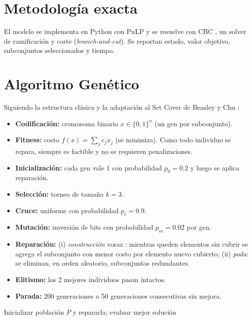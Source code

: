 \documentclass[11pt,a4paper]{article}
\begin{document}
\section{Metodolog\'ia exacta}
El modelo se implementa en Python con PuLP \cite{mitchell2011pulp} y se resuelve con CBC \cite{cbc},
un solver de ramificaci\'on y corte (\textit{branch-and-cut}). Se reportan estado, valor objetivo,
subconjuntos seleccionados y tiempo. %

\section{Algoritmo Gen\'etico}
Siguiendo la estructura cl\'asica \cite{holland1975,goldberg1989} y la adaptaci\'on al Set Cover de
Beasley y Chu \cite{beasley1996}:
\begin{itemize}
  \item \textbf{Codificaci\'on:} cromosoma binario $x\in\{0,1\}^n$ (un gen por subconjunto).
  \item \textbf{Fitness:} costo $f(x)=\sum_j c_jx_j$ (se minimiza). Como todo individuo se repara, siempre es factible y no se requieren penalizaciones.
  \item \textbf{Inicializaci\'on:} cada gen vale 1 con probabilidad $p_0=0.2$ y luego se aplica reparaci\'on.
  \item \textbf{Selecci\'on:} torneo de tama\~no $k=3$.
  \item \textbf{Cruce:} uniforme con probabilidad $p_c=0.9$.
  \item \textbf{Mutaci\'on:} inversi\'on de bits con probabilidad $p_m=0.02$ por gen.
  \item \textbf{Reparaci\'on:} (i) \emph{construcci\'on} voraz \cite{chvatal1979}: mientras queden elementos sin cubrir se agrega el subconjunto con menor costo por elemento nuevo cubierto; (ii) \emph{poda}: se eliminan, en orden aleatorio, subconjuntos redundantes.
  \item \textbf{Elitismo:} los 2 mejores individuos pasan intactos.
  \item \textbf{Parada:} 200 generaciones o 50 generaciones consecutivas sin mejora.
\end{itemize}
\begin{algorithm}[H]
\caption{Algoritmo Gen\'etico con reparaci\'on}
Inicializar poblaci\'on $P$ y repararla; evaluar\;
\Return mejor soluci\'on\;
\end{algorithm}
\end{document}
